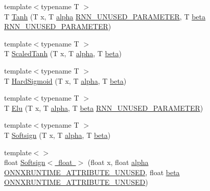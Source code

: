 \begin{DoxyCompactItemize}
\item 
{\footnotesize template$<$typename T $>$ }\\T \mbox{\hyperlink{namespaceonnxruntime_1_1rnn_1_1detail_a85c6f09d8c78bdc30e1edf2cec3a1eae}{Tanh}} (T x, T \mbox{\hyperlink{mlasi_8h_a1763355f32e1812e5cb3a0080e7cca12}{alpha}} \mbox{\hyperlink{rnn__activation__functors_8h_a2f7cd9def0156219f0b79c6ed32a1d22}{R\+N\+N\+\_\+\+U\+N\+U\+S\+E\+D\+\_\+\+P\+A\+R\+A\+M\+E\+T\+ER}}, T \mbox{\hyperlink{mlasi_8h_a5fd37d216981b4cd9a19e29b5acd48d4}{beta}} \mbox{\hyperlink{rnn__activation__functors_8h_a2f7cd9def0156219f0b79c6ed32a1d22}{R\+N\+N\+\_\+\+U\+N\+U\+S\+E\+D\+\_\+\+P\+A\+R\+A\+M\+E\+T\+ER}})
\item 
{\footnotesize template$<$typename T $>$ }\\T \mbox{\hyperlink{namespaceonnxruntime_1_1rnn_1_1detail_a0bdc679e113bdd5ababfbf3875c713da}{Scaled\+Tanh}} (T x, T \mbox{\hyperlink{mlasi_8h_a1763355f32e1812e5cb3a0080e7cca12}{alpha}}, T \mbox{\hyperlink{mlasi_8h_a5fd37d216981b4cd9a19e29b5acd48d4}{beta}})
\item 
{\footnotesize template$<$typename T $>$ }\\T \mbox{\hyperlink{namespaceonnxruntime_1_1rnn_1_1detail_afe98724eebce57469762e7bbbc4312ae}{Hard\+Sigmoid}} (T x, T \mbox{\hyperlink{mlasi_8h_a1763355f32e1812e5cb3a0080e7cca12}{alpha}}, T \mbox{\hyperlink{mlasi_8h_a5fd37d216981b4cd9a19e29b5acd48d4}{beta}})
\item 
{\footnotesize template$<$typename T $>$ }\\T \mbox{\hyperlink{namespaceonnxruntime_1_1rnn_1_1detail_a8ee9d7ee665498c10ffcc34b97e3aa4e}{Elu}} (T x, T \mbox{\hyperlink{mlasi_8h_a1763355f32e1812e5cb3a0080e7cca12}{alpha}}, T \mbox{\hyperlink{mlasi_8h_a5fd37d216981b4cd9a19e29b5acd48d4}{beta}} \mbox{\hyperlink{rnn__activation__functors_8h_a2f7cd9def0156219f0b79c6ed32a1d22}{R\+N\+N\+\_\+\+U\+N\+U\+S\+E\+D\+\_\+\+P\+A\+R\+A\+M\+E\+T\+ER}})
\item 
{\footnotesize template$<$typename T $>$ }\\T \mbox{\hyperlink{namespaceonnxruntime_1_1rnn_1_1detail_a9612484323d785817381cc5d42a8ca2d}{Softsign}} (T x, T \mbox{\hyperlink{mlasi_8h_a1763355f32e1812e5cb3a0080e7cca12}{alpha}}, T \mbox{\hyperlink{mlasi_8h_a5fd37d216981b4cd9a19e29b5acd48d4}{beta}})
\item 
{\footnotesize template$<$$>$ }\\float \mbox{\hyperlink{namespaceonnxruntime_1_1rnn_1_1detail_a18e66157fedc94adca78a7ba550e092d}{Softsign$<$ float $>$}} (float x, float \mbox{\hyperlink{mlasi_8h_a1763355f32e1812e5cb3a0080e7cca12}{alpha}} \mbox{\hyperlink{include_2onnxruntime_2core_2common_2common_8h_a61142a7de4b478dbe3fe741dd928c211}{O\+N\+N\+X\+R\+U\+N\+T\+I\+M\+E\+\_\+\+A\+T\+T\+R\+I\+B\+U\+T\+E\+\_\+\+U\+N\+U\+S\+ED}}, float \mbox{\hyperlink{mlasi_8h_a5fd37d216981b4cd9a19e29b5acd48d4}{beta}} \mbox{\hyperlink{include_2onnxruntime_2core_2common_2common_8h_a61142a7de4b478dbe3fe741dd928c211}{O\+N\+N\+X\+R\+U\+N\+T\+I\+M\+E\+\_\+\+A\+T\+T\+R\+I\+B\+U\+T\+E\+\_\+\+U\+N\+U\+S\+ED}})

\end{DoxyCompactItemize}
